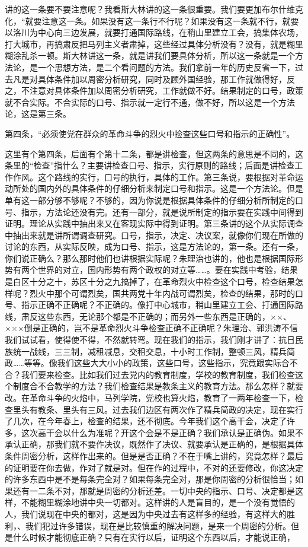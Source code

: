 讲的这一条要不要注意呢？我看斯大林讲的这一条很重要。我们要更加布尔什维克化，“就要注意这一条。如果没有这一条行不行呢？如果没有这一条就不行，就要以洛川为中心向三边发展，就要打通国际路线，在稍山里建立工会，搞集体农场，打大城市，再搞肃反把马列主义者肃掉，这些经过具体分析没有？没有，就是糊里糊涂乱杀一顿。斯大林讲这一条，就是讲我们要具体分析，所以这一条就是一个方法论，是一个思想方法，是二个看问题的方法。我们拿前一年的历史反省一下，过去凡是对具体条件加以周密分析研究，同时及顾外国经验，那工作就做得好，反之，不注意对具体条件加以周密分析研究，工作就做不好。结果制定的口号，政策就不合实际。不合实际的口号、指示就一定行不通，做不好，所以这是一个方法论，这是第三条。

第四条，“必须使党在群众的革命斗争的烈火中捡查这些口号和指示的正确性”。

这里有个第四条，后面有个第十二条，都是讲检查，但这两条的意思是不同的，这条里的“检查”指什么？主要讲检查口号、指示，实行原则的路线；后面是讲检查工作作风。这个路线的实行，口号的执行，具体的工作。第三条说，要根据对革命运动所处的国内外的具体条件的仔细分析来制定口号和指示。这是一个方法论。但是单有这一部分够不够呢？不够的，因为你说是根据具体条件的仔细分析所制定的口号、指示，方法论还没有完。还有一部分，就是说所制定的指示要在实践中间得到证明。理论从实践中抽出来又在客现实际中得到证明。第三条讲的这个从实际调查中抽出来就是讲所谓调查研究。口号，指示，决定、决议案，就像你们现在所做的讨论的东西，从实际反映，成为口号、指示，这是方法论的，第一条。还有一条，你们说正确么？那么那时他们也讲根据实际呢？朱理治也讲的，他也是根据国际形势有两个世界的对立，国内形势有两个政权的对立等……。要在实践中考验，结果是白区十分之十，苏区十分之九搞掉了，在革命烈火中检查这个口号，检查结果怎样呢？烈火中那个可谓烈矣，国共两党十年内战可谓烈矣，检查的结果，那时的口号、指示正确不正确呢？不正确的。像打中心城市，稍山里建立工会、打通国际路线，肃反这些东西，无论那个都是不正确的；而另外一些东西是正确的，××、×××倒是正确的，岂不是革命烈火斗争检查正确不正确呢？朱理治、郭洪涛不信我们试试看，使得使不得，不然就转弯。现在我们的指示，我们刚才讲了：抗日民族统一战线，三三制，减租减息，交租交息，十小时工作制，整顿三风，精兵简政……等等。像我们这些大大小小的政策，这些口号，这些指示，究竟跟实际合不合？我们要来检查。比如我们过去党内的教育制度，学校的教育制度，我们检查这个制度合不合教学的方法？我们检查结果是教条主义的教育方法。那么怎样？就要改。在革命斗争的火焰中，马列学院，党校也算火焰，教育了一两年检查一下，检查里头有教条、里头有三风。过去我们边区有两次作了精兵简政的决定，现在实行了几次，在今年春上，检查的结果，还不彻底。今年我们这个高干会，决定了许多，这次高干会以什么为准呢？开这个会是不是正确？我们承认是正确伪。如果不承认正确，那我们就不要作决议，既然作了决议、就要承认是正确的，是根据具体条件周密分析，这样作出来的。但是是否正确？不在于嘴上讲的，究竟怎样？最后的证明要在你去做，作对了就是对。但在作的过程中，不对的还要修改，你这决定的许多东西中是不是每条完全对？如果每条完全对，那是你周密的分析很恰当；如果还有一二条不对，那就是周密的分析还差。一切中央的指示、口号、决定都是这样，不能糊里糊涂地讲中央一切都对。这样讲的人是盲目的，是一个没有觉悟的人，我们说现在中央的都对，这是因为中央过去有这样多的经验，有这样大的胜利，、我们犯过许多错误，现在是比较慎重的解决问题，是来一个周密的分析。但是什么时候才能彻底正确？只有在实行以后，证明这个东西以后，才能说正确，
